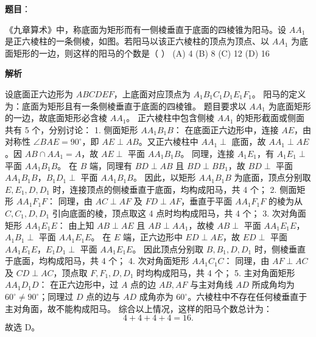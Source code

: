 \begin{answer}

\textbf{题目}：

《九章算术》中，称底面为矩形而有一侧棱垂直于底面的四棱锥为阳马。设 $AA_1$ 是正六棱柱的一条侧棱，如图。若阳马以该正六棱柱的顶点为顶点、以 $AA_1$ 为底面矩形的一边，则这样的阳马的个数是（ ）
(A) 4
(B) 8
(C) 12
(D) 16
\nopagebreak[4]
\begin{center}\end{center}
\nopagebreak[4]
\textbf{解析}

设底面正六边形为 $ABCDEF$，上底面对应顶点为 $A_1B_1C_1D_1E_1F_1$。
阳马的定义为：底面为矩形且有一条侧棱垂直于底面的四棱锥。
题目要求以 $AA_1$ 为底面矩形的一边，故底面矩形必含棱 $AA_1$。
正六棱柱中包含侧棱 $AA_1$ 的矩形截面或侧面共有 5 个，分别讨论：
1. 侧面矩形 $AA_1B_1B$：
   在底面正六边形中，连接 $AE$，由对称性 $\angle BAE = 90^\circ$，即 $AE \perp AB$。又正六棱柱中 $AA_1 \perp$ 底面，故 $AA_1 \perp AE$。因 $AB \cap AA_1 = A$，故 $AE \perp$ 平面 $AA_1B_1B$。
   同理，连接 $A_1E_1$，有 $A_1E_1 \perp$ 平面 $AA_1B_1B$。
   在 $B$ 端，同理有 $BD \perp AB$ 且 $BD \perp BB_1$，故 $BD \perp$ 平面 $AA_1B_1B$，$B_1D_1 \perp$ 平面 $AA_1B_1B$。
   因此，以矩形 $AA_1B_1B$ 为底面，顶点分别取 $E, E_1, D, D_1$ 时，连接顶点的侧棱垂直于底面，均构成阳马，共 4 个；
2. 侧面矩形 $AA_1F_1F$：
   同理，由 $AC \perp AF$ 及 $FD \perp AF$，垂直于平面 $AA_1F_1F$ 的棱为从 $C, C_1, D, D_1$ 引向底面的棱，顶点取这 4 点时均构成阳马，共 4 个；
3. 次对角面矩形 $AA_1E_1E$：
   由上知 $AB \perp AE$ 且 $AB \perp AA_1$，故棱 $AB \perp$ 平面 $AA_1E_1E$，$A_1B_1 \perp$ 平面 $AA_1E_1E$。
   在 $E$ 端，正六边形中 $ED \perp AE$，故 $ED \perp$ 平面 $AA_1E_1E$，$E_1D_1 \perp$ 平面 $AA_1E_1E$。
   因此顶点分别取 $B, B_1, D, D_1$ 时，侧棱垂直于底面，均构成阳马，共 4 个；
4. 次对角面矩形 $AA_1C_1C$：
   同理，由 $AF \perp AC$ 及 $CD \perp AC$，顶点取 $F, F_1, D, D_1$ 时均构成阳马，共 4 个；
5. 主对角面矩形 $AA_1D_1D$：
   在正六边形中，过 $A$ 点的边 $AB, AF$ 与主对角线 $AD$ 所成角均为 $60^\circ \ne 90^\circ$；同理过 $D$ 点的边与 $AD$ 成角亦为 $60^\circ$。六棱柱中不存在任何棱垂直于主对角面，故不能构成阳马。
综合以上情况，这样的阳马个数总计为：
\nopagebreak[4]
\[4 + 4 + 4 + 4 = 16.\]
故选 D。


\end{answer}
